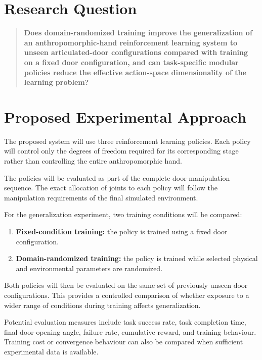 \documentclass[12pt,a4paper]{report}
\begin{document}
\section{Research Question}

\begin{quote}
\textbf{Does domain-randomized training improve the generalization of an anthropomorphic-hand reinforcement learning system to unseen articulated-door configurations compared with training on a fixed door configuration, and can task-specific modular policies reduce the effective action-space dimensionality of the learning problem?}
\end{quote}

\section{Proposed Experimental Approach}

The proposed system will use three reinforcement learning policies. Each policy will control only the degrees of freedom required for its corresponding stage rather than controlling the entire anthropomorphic hand.

The policies will be evaluated as part of the complete door-manipulation sequence. The exact allocation of joints to each policy will follow the manipulation requirements of the final simulated environment.

For the generalization experiment, two training conditions will be compared:

\begin{enumerate}
    \item \textbf{Fixed-condition training:} the policy is trained using a fixed door configuration.
    \item \textbf{Domain-randomized training:} the policy is trained while selected physical and environmental parameters are randomized.
\end{enumerate}

Both policies will then be evaluated on the same set of previously unseen door configurations. This provides a controlled comparison of whether exposure to a wider range of conditions during training affects generalization.

Potential evaluation measures include task success rate, task completion time, final door-opening angle, failure rate, cumulative reward, and training behaviour. Training cost or convergence behaviour can also be compared when sufficient experimental data is available.
\end{document}
